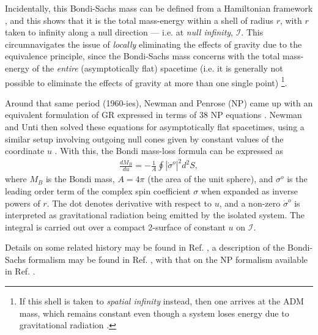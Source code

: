 \documentclass[aps,pre,preprint,superscriptaddress,showpacs,showkeys]{revtex4-1}
\begin{document}
Incidentally, this Bondi-Sachs mass can be defined from a Hamiltonian framework \cite{Poisson,BLY}, and this shows that it is the total mass-energy within a shell of radius $r$, with $r$ taken to infinity along a null direction --- i.e. at \emph{null infinity}, $\mathcal{I}$. This circumnavigates the issue of \emph{locally} eliminating the effects of gravity due to the equivalence principle, since the Bondi-Sachs mass concerns with the total mass-energy of the \emph{entire} (asymptotically flat) spacetime (i.e. it is generally not possible to eliminate the effects of gravity at more than one single point) \footnote{If this shell is taken to \emph{spatial infinity} instead, then one arrives at the ADM mass, which remains constant even though a system loses energy due to gravitational radiation \cite{adm,ADMDDD,200years,Poisson}.}.


Around that same period (1960-ies), Newman and Penrose (NP) came up with an equivalent formulation of GR expressed in terms of 38 NP equations \cite{newpen62}. Newman and Unti then solved these equations for asymptotically flat spacetimes, using a similar setup involving outgoing null cones given by constant values of the coordinate $u$ \cite{newunti62}. With this, the Bondi mass-loss formula can be expressed as
\begin{eqnarray}\label{Bondimasslossflat}
\frac{dM_B}{du}=-\frac{1}{A}\oint{|\dot{\sigma}^o|^2d^2S},
\end{eqnarray}
where $M_B$ is the Bondi mass, $A=4\pi$ (the area of the unit sphere), and $\sigma^o$ is the leading order term of the complex spin coefficient $\sigma$ when expanded as inverse powers of $r$. The dot denotes derivative with respect to $u$, and a non-zero $\dot{\sigma}^o$ is interpreted as gravitational radiation being emitted by the isolated system. The integral is carried out over a compact 2-surface of constant $u$ on $\mathcal{I}$.

Details on some related history may be found in Ref. \cite{Fra04}, a description of the Bondi-Sachs formalism may be found in Ref. \cite{MadWini}, with that on the NP formalism available in Ref. \cite{NP}.
\end{document}
